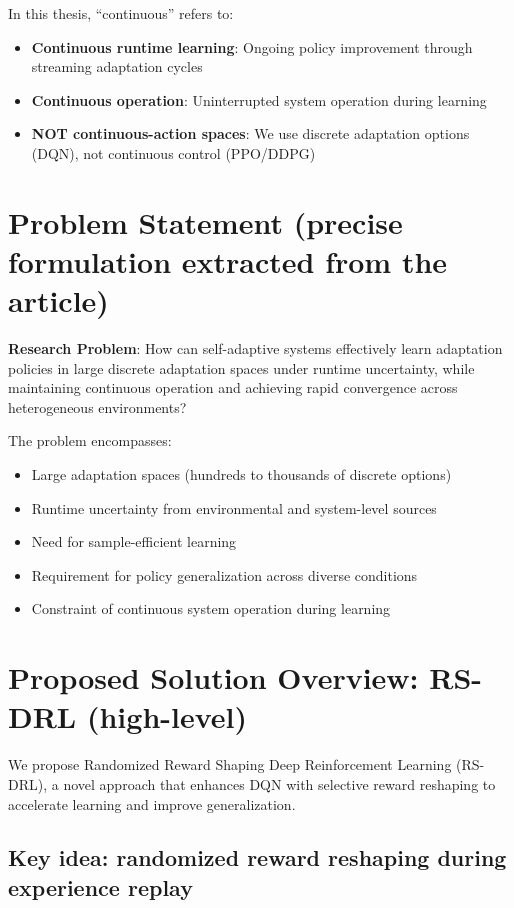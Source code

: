 \documentclass[11pt,a4paper]{article}
\begin{document}
In this thesis, ``continuous'' refers to:
\begin{itemize}
    \item \textbf{Continuous runtime learning}: Ongoing policy improvement through streaming adaptation cycles
    \item \textbf{Continuous operation}: Uninterrupted system operation during learning
    \item \textbf{NOT continuous-action spaces}: We use discrete adaptation options (DQN), not continuous control (PPO/DDPG)
\end{itemize}

\section{Problem Statement (precise formulation extracted from the article)}

\textbf{Research Problem}: How can self-adaptive systems effectively learn adaptation policies in large discrete adaptation spaces under runtime uncertainty, while maintaining continuous operation and achieving rapid convergence across heterogeneous environments?

The problem encompasses:
\begin{itemize}
    \item Large adaptation spaces (hundreds to thousands of discrete options)
    \item Runtime uncertainty from environmental and system-level sources
    \item Need for sample-efficient learning
    \item Requirement for policy generalization across diverse conditions
    \item Constraint of continuous system operation during learning
\end{itemize}

\section{Proposed Solution Overview: RS-DRL (high-level)}

We propose Randomized Reward Shaping Deep Reinforcement Learning (RS-DRL), a novel approach that enhances DQN with selective reward reshaping to accelerate learning and improve generalization.

\subsection{Key idea: randomized reward reshaping during experience replay}
\end{document}
